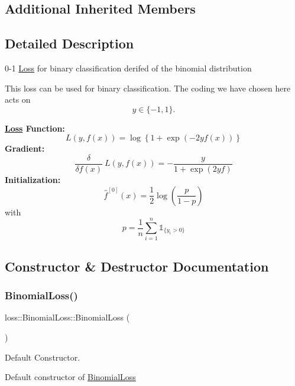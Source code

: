 \subsection*{Additional Inherited Members}


\subsection{Detailed Description}
0-\/1 \mbox{\hyperlink{classloss_1_1_loss}{Loss}} for binary classification derifed of the binomial distribution 

This loss can be used for binary classification. The coding we have chosen here acts on \[ y \in \{-1, 1\}. \]

{\bfseries \mbox{\hyperlink{classloss_1_1_loss}{Loss}} Function\+:} \[ L(y, f(x)) = \log\left\{1 + \exp\left(-2yf(x)\right)\right\} \] {\bfseries Gradient\+:} \[ \frac{\delta}{\delta f(x)}\ L(y, f(x)) = - \frac{y}{1 + \exp\left(2yf\right)} \] {\bfseries Initialization\+:} \[ \hat{f}^{[0]}(x) = \frac{1}{2}\log\left(\frac{p}{1 - p}\right) \] with \[ p = \frac{1}{n}\sum\limits_{i=1}^n\mathbb{1}_{\{y_i > 0\}} \] 

\subsection{Constructor \& Destructor Documentation}
\mbox{\label{classloss_1_1_binomial_loss_ab903b1364d0569c83b4f44d8c7af0f69}} 
\subsubsection{\texorpdfstring{Binomial\+Loss()}{LossBinomial()}\hspace{0.1cm}{\footnotesize\ttfamily [1/2]}}
{\footnotesize\ttfamily loss\+::\+Binomial\+Loss\+::\+Binomial\+Loss (\begin{DoxyParamCaption}{ }\end{DoxyParamCaption})}



Default Constructor. 

Default constructor of {\ttfamily \mbox{\hyperlink{classloss_1_1_binomial_loss}{Binomial\+Loss}}} \mbox{\label{classloss_1_1_binomial_loss_aac60ad4791933f54fb9858e8d89ba6a5}} 
